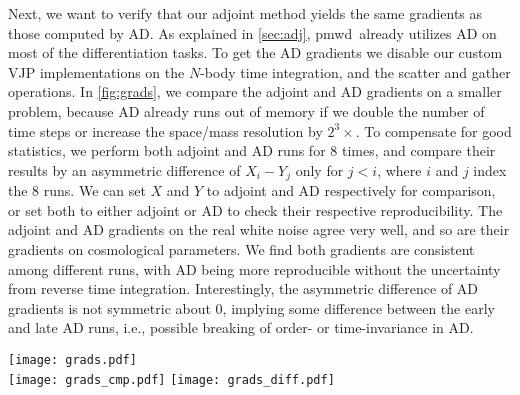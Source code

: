\documentclass[modern, trackchanges, dvipsnames]{aastex631}
\newcommand{\pmwd}{{\usefont{T1}{nova}{m}{sl}pmwd}}
\newcommand{\Mpc}{\mathrm{Mpc}}
\begin{document}
Next, we want to verify that our adjoint method yields the same
gradients as those computed by AD.
As explained in \autoref{sec:adj}, \pmwd\ already utilizes AD on most of
the differentiation tasks.
To get the AD gradients we disable our custom VJP implementations on the
$N$-body time integration, and the scatter and gather operations.
In \autoref{fig:grads}, we compare the adjoint and AD gradients on a
smaller problem, because AD already runs out of memory if we double the
number of time steps or increase the space/mass resolution by
$2^3\times$.
To compensate for good statistics, we perform both adjoint and AD runs
for 8 times, and compare their results by an asymmetric difference of
$X_i - Y_j$ only for $j<i$, where $i$ and $j$ index the 8 runs.
We can set $X$ and $Y$ to adjoint and AD respectively for comparison, or
set both to either adjoint or AD to check their respective
reproducibility.
The adjoint and AD gradients on the real white noise agree very well,
and so are their gradients on cosmological parameters.
We find both gradients are consistent among different runs, with AD
being more reproducible without the uncertainty from reverse time
integration.
Interestingly, the asymmetric difference of AD gradients is not
symmetric about 0, implying some difference between the early and late
AD runs, i.e., possible breaking of order- or time-invariance in AD.


\begin{figure*}[t]
\centering
\texttt{[image: grads.pdf]}
\\
\vspace{1em}
\texttt{[image: grads\_cmp.pdf]}
\hfill
\texttt{[image: grads\_diff.pdf]}
\caption{Adjoint gradients of a $128\times128$ slice of the real white
noise fields, in a \pmwd\ simulation of $128^3$ particles in a
$(128\,\Mpc/h)^3$ box, with a $256^3$ mesh, 15 time steps, and single
precision.
We compare the adjoint gradients to those by AD, for which we have
disabled the custom gradient implementation on the scatter, gather, and
$N$-body time stepping operators.
The adjoint and AD gradients agree as expected, with a RMSD of $\approx
4\times10^{-5}$, 3 orders of magnitude smaller than the standard
deviation of the gradients itself, $\approx 0.015$.
It is also comparable to the difference between two different adjoint
gradients, with a RMSD $\approx 5\times10^{-5}$.
Different AD gradients are more consistent, with a tighter RMSD of
$\approx 1\times10^{-5}$ due to the absence of uncertainty from reverse
time integration.
}
\label{fig:grads}
\end{figure*}
\end{document}
